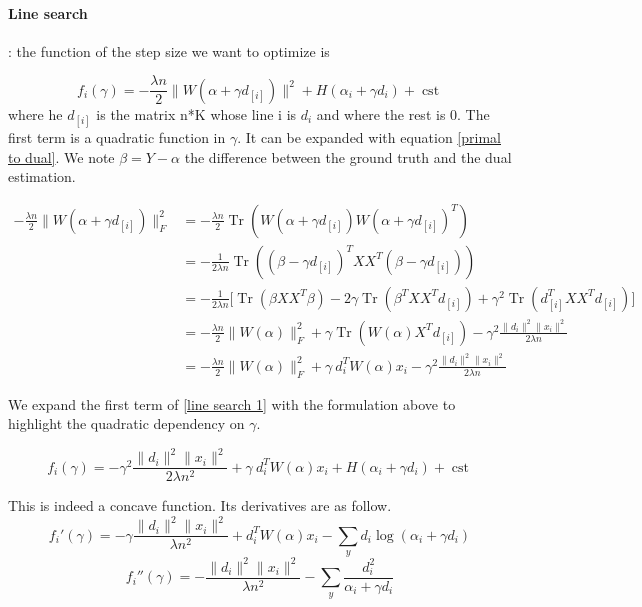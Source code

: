 \documentclass{article}
\DeclareMathOperator{\Tr}{Tr}
\DeclareMathOperator{\cst}{cst}
\DeclareMathOperator{\1}{\mathbb{1}}
\begin{document}


\paragraph{Line search }: the function of the step size we want to optimize is 

\begin{equation}
	\label{line search 1}
	f_i(\gamma) = -\frac{\lambda n}{2} \|W(\alpha + \gamma d_{[i]})\|^2 + H(\alpha_i + \gamma d_i) + \cst
\end{equation}
where he $d_{[i]}$ is the matrix n*K whose line i is $d_i$ and where the rest is 0.
The first term is a quadratic function in $\gamma$.
It can be expanded with equation \ref{primal to dual}.
We note $\beta = Y - \alpha$ the difference between the ground truth and the dual estimation. 

\begin{align*}
	-\frac{\lambda n}{2} \|W(\alpha + \gamma d_{[i]})\|_F^2 & = -\frac{\lambda n}{2} \Tr(W(\alpha + \gamma d_{[i]}) W(\alpha + \gamma d_{[i]})^T) \\
	& = -\frac{1}{2\lambda n} \Tr((\beta - \gamma d_{[i]})^T X X^T (\beta - \gamma d_{[i]})) \\
	& = -\frac{1}{2\lambda n} \bigg[ \Tr(\beta X X^T \beta) - 2\gamma\Tr(\beta^TXX^Td_{[i]}) + \gamma^2 \Tr(d_{[i]}^TXX^Td_{[i]})\bigg] \\
	& = -\frac{\lambda n}{2} \|W(\alpha)\|_F^2 + \gamma\Tr(W(\alpha)X^Td_{[i]}) - \gamma^2 \frac{\|d_i\|^2 \|x_i\|^2}{2\lambda n} \\
	& = -\frac{\lambda n}{2} \|W(\alpha)\|_F^2 + \gamma \ d_i^T W(\alpha) x_i - \gamma^2 \frac{\|d_i\|^2 \|x_i\|^2}{2\lambda n}
\end{align*}

We expand the first term  of \ref{line search 1} with the formulation above to highlight the quadratic dependency on $\gamma$.

\begin{equation}
	f_i(\gamma) = - \gamma^2 \frac{\|d_i\|^2 \|x_i\|^2}{2\lambda n^2} + \gamma \ d_i^T W(\alpha) x_i + H(\alpha_i + \gamma d_i) + \cst
\end{equation} 

This is indeed a concave function.
Its derivatives are as follow.
\begin{equation}
	f_i'(\gamma) = - \gamma \frac{\|d_i\|^2 \|x_i\|^2}{\lambda n^2} + d_i^T W(\alpha) x_i- \sum_y d_i \log(\alpha_i + \gamma d_i)
\end{equation}
\begin{equation}
	f_i''(\gamma) = - \frac{\|d_i\|^2 \|x_i\|^2}{\lambda n^2} - \sum_y \frac{d_i^2}{\alpha_i + \gamma d_i}
\end{equation}
\end{document}
